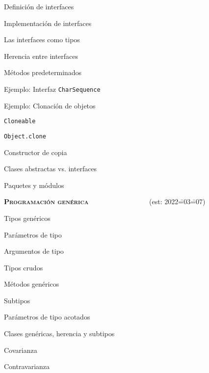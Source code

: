 \begin{longenum}
\begin{longenum}
        \begin{longenum}
            \item Definición de interfaces
            \item Implementación de interfaces
            \item Las interfaces como tipos
            \item Herencia entre interfaces
            \item Métodos predeterminados
            \item Ejemplo: Interfaz \texttt{CharSequence}
            \item Ejemplo: Clonación de objetos
            \begin{longenum}
                \item \texttt{Cloneable}
                \item \texttt{Object.clone}
                \item Constructor de copia
            \end{longenum}
            \item Clases abstractas vs. interfaces
        \end{longenum}
        \item Paquetes y módulos
    \end{longenum}
    \item \textbf{\textsc{Programación genérica}} \ \ \ \ \ \ \ \ \ \ \ \ \ \ \ \ \ (est: 2022\==03\==07)
    \begin{longenum}
        \item Tipos genéricos
        \begin{longenum}
            \item Parámetros de tipo
            \item Argumentos de tipo
            \item Tipos crudos
        \end{longenum}
        \item Métodos genéricos
        \item Subtipos
        \begin{longenum}
            \item Parámetros de tipo acotados
            \item Clases genéricas, herencia y subtipos
            \begin{longenum}
                \item Covarianza
                \item Contravarianza

\end{longenum}
\end{longenum}
\end{longenum}
\end{longenum}
